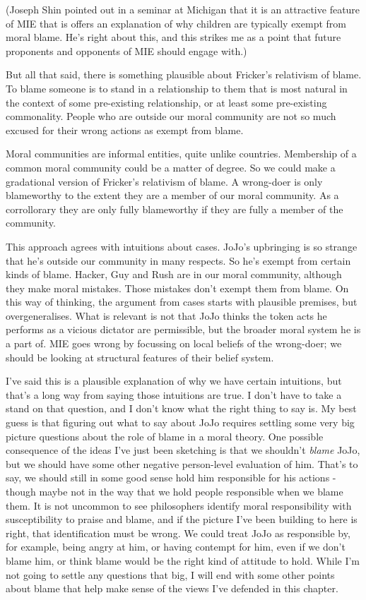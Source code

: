 \documentclass[
  10pt,
  letterpaper,
  twoside]{scrbook}
\begin{document}
(Joseph Shin pointed out in a seminar at Michigan that it is an
attractive feature of MIE that is offers an explanation of why children
are typically exempt from moral blame. He's right about this, and this
strikes me as a point that future proponents and opponents of MIE should
engage with.)

But all that said, there is something plausible about Fricker's
relativism of blame. To blame someone is to stand in a relationship to
them that is most natural in the context of some pre-existing
relationship, or at least some pre-existing commonality. People who are
outside our moral community are not so much excused for their wrong
actions as exempt from blame.

Moral communities are informal entities, quite unlike countries.
Membership of a common moral community could be a matter of degree. So
we could make a gradational version of Fricker's relativism of blame. A
wrong-doer is only blameworthy to the extent they are a member of our
moral community. As a corrollorary they are only fully blameworthy if
they are fully a member of the community.

This approach agrees with intuitions about cases. {JoJo}'s upbringing is
so strange that he's outside our community in many respects. So he's
exempt from certain kinds of blame. {Hacker}, {Guy} and {Rush} are in
our moral community, although they make moral mistakes. Those mistakes
don't exempt them from blame. On this way of thinking, the argument from
cases starts with plausible premises, but overgeneralises. What is
relevant is not that {JoJo} thinks the token acts he performs as a
vicious dictator are permissible, but the broader moral system he is a
part of. MIE goes wrong by focussing on local beliefs of the wrong-doer;
we should be looking at structural features of their belief system.

I've said this is a plausible explanation of why we have certain
intuitions, but that's a long way from saying those intuitions are true.
I don't have to take a stand on that question, and I don't know what the
right thing to say is. My best guess is that figuring out what to say
about {JoJo} requires settling some very big picture questions about the
role of blame in a moral theory. One possible consequence of the ideas
I've just been sketching is that we shouldn't \emph{blame} {JoJo}, but
we should have some other negative person-level evaluation of him.
That's to say, we should still in some good sense hold him responsible
for his actions - though maybe not in the way that we hold people
responsible when we blame them. It is not uncommon to see philosophers
identify moral responsibility with susceptibility to praise and blame,
and if the picture I've been building to here is right, that
identification must be wrong. We could treat {JoJo} as responsible by,
for example, being angry at him, or having contempt for him, even if we
don't blame him, or think blame would be the right kind of attitude to
hold. While I'm not going to settle any questions that big, I will end
with some other points about blame that help make sense of the views
I've defended in this chapter.
\end{document}
